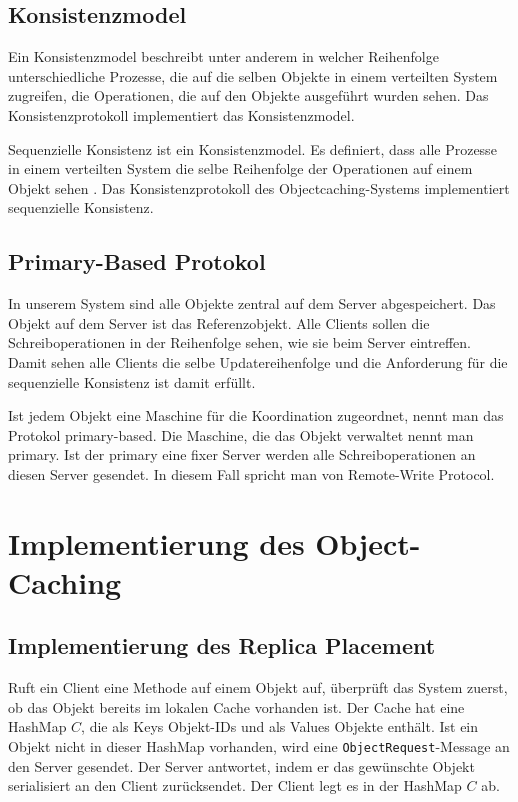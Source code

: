 \subsection{Konsistenzmodel}
\label{sec:konsistenzmodel}

Ein Konsistenzmodel beschreibt unter anderem in welcher Reihenfolge unterschiedliche Prozesse, die auf die selben Objekte in einem verteilten System zugreifen, die Operationen, die auf den Objekte ausgeführt wurden sehen. Das Konsistenzprotokoll implementiert das Konsistenzmodel.

Sequenzielle Konsistenz ist ein Konsistenzmodel. Es definiert, dass alle Prozesse in einem verteilten System die selbe Reihenfolge der Operationen auf einem Objekt sehen \cite{tanenbaum07}.  Das Konsistenzprotokoll des Objectcaching-Systems implementiert sequenzielle Konsistenz.

\subsection{Primary-Based Protokol}
\label{sec:prim-based-prot}

In unserem System sind alle Objekte zentral auf dem Server abgespeichert. Das Objekt auf dem Server ist das Referenzobjekt. Alle Clients sollen die Schreiboperationen in der Reihenfolge sehen, wie sie beim Server eintreffen. Damit sehen alle Clients die selbe Updatereihenfolge und die Anforderung für die sequenzielle Konsistenz ist damit erfüllt. 

Ist jedem Objekt eine Maschine für die Koordination zugeordnet, nennt man das Protokol primary-based\cite{tanenbaum07}. Die Maschine, die das Objekt verwaltet nennt man primary. Ist der primary eine fixer Server werden alle Schreiboperationen an diesen Server gesendet. In diesem Fall spricht man von Remote-Write Protocol.

\section{Implementierung des Object-Caching}
\label{sec:impl-object-kons}

\subsection{Implementierung des Replica Placement}
\label{sec:impl-des-repl-1}

Ruft ein Client eine Methode auf einem Objekt auf, überprüft das System zuerst, ob das Objekt bereits im lokalen Cache vorhanden ist. Der Cache hat eine HashMap $C$, die als Keys Objekt-IDs und als Values Objekte enthält. Ist ein Objekt nicht in dieser HashMap vorhanden, wird eine \verb+ObjectRequest+-Message an den Server gesendet. Der Server antwortet, indem er das gewünschte Objekt serialisiert an den Client zurücksendet. Der Client legt es in der HashMap $C$ ab. 

